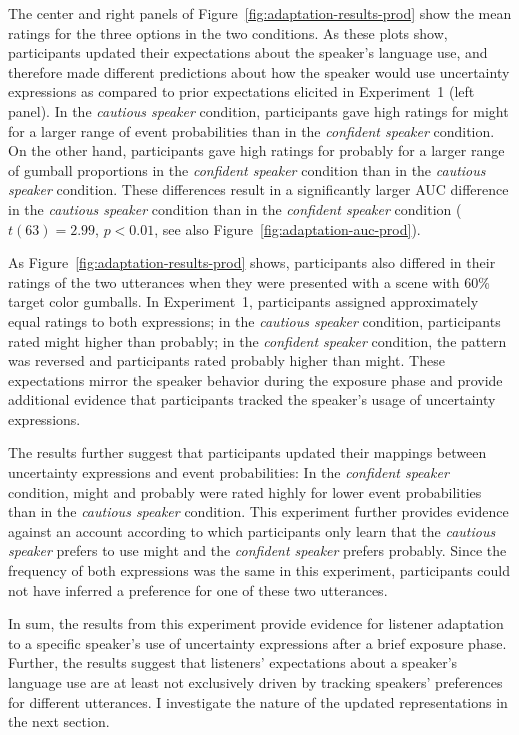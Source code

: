 The center and right panels of Figure~\ref{fig:adaptation-results-prod} show the mean ratings for the three options in the two conditions. As these plots show, participants updated their expectations about the speaker's language use, and therefore made different predictions about how the speaker would use uncertainty expressions as compared to prior expectations elicited in Experiment~1 (left panel). In the \emph{cautious speaker} condition, participants gave high ratings for {\sc might} for a larger range of event probabilities than in the \emph{confident speaker} condition. On the other hand, participants gave high ratings for {\sc probably} for a larger range of gumball proportions in the \emph{confident speaker} condition than in the \emph{cautious speaker} condition. These differences result in a significantly larger AUC difference in the \emph{cautious speaker} condition than in the \emph{confident speaker} condition ($t(63) = 2.99$, $p < 0.01$, see also Figure~\ref{fig:adaptation-auc-prod}).

As Figure~\ref{fig:adaptation-results-prod} shows, participants also differed in their ratings of the two utterances when they were presented with a scene with 60\% target color gumballs. In Experiment~1, participants assigned approximately equal ratings to both expressions; in the \emph{cautious speaker} condition, participants rated {\sc might} higher than {\sc probably}; in the \emph{confident speaker} condition, the pattern was reversed and participants rated {\sc probably} higher than {\sc might}. These expectations mirror the speaker behavior during the exposure phase and provide additional evidence that participants tracked the speaker's usage of uncertainty expressions. 

The results further suggest that participants updated their mappings between uncertainty expressions and event probabilities: In the {\it confident speaker} condition, {\sc might} and {\sc probably} were rated highly for lower event probabilities than in the {\it cautious speaker} condition. This experiment further provides evidence against an account according to which participants only learn that the \emph{cautious speaker} prefers to use {\sc might} and the {\it confident speaker} prefers {\sc probably}. Since the frequency of both expressions was the same in this experiment, participants could not have inferred a preference for one of these two utterances. 

In sum, the results from this experiment provide evidence for listener adaptation to a specific speaker's use of uncertainty expressions after a brief exposure phase. Further, the results 
suggest that listeners' expectations about a speaker's language use are at least not exclusively driven by tracking speakers' preferences for different utterances. I investigate the nature of the updated representations in the next section.


